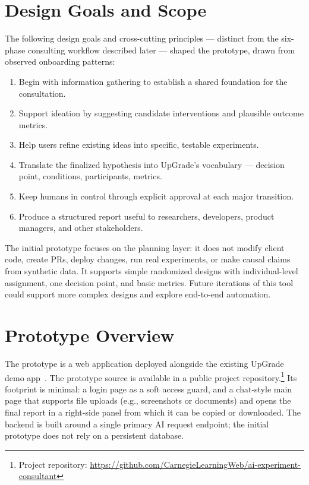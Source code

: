 \documentclass[manuscript,screen]{acmart}
\begin{document}
\section{Design Goals and Scope}

The following design goals and cross-cutting principles --- distinct from the six-phase consulting workflow described later --- shaped the prototype, drawn from observed onboarding patterns:

\begin{enumerate}
  \item Begin with information gathering to establish a shared foundation for the consultation.
  \item Support ideation by suggesting candidate interventions and plausible outcome metrics.
  \item Help users refine existing ideas into specific, testable experiments.
  \item Translate the finalized hypothesis into UpGrade's vocabulary --- decision point, conditions, participants, metrics.
  \item Keep humans in control through explicit approval at each major transition.
  \item Produce a structured report useful to researchers, developers, product managers, and other stakeholders.
\end{enumerate}

The initial prototype focuses on the planning layer: it does not modify client code, create PRs, deploy changes, run real experiments, or make causal claims from synthetic data. It supports simple randomized designs with individual-level assignment, one decision point, and basic metrics. Future iterations of this tool could support more complex designs and explore end-to-end automation. 

\section{Prototype Overview}

The prototype is a web application deployed alongside the existing UpGrade demo app~\cite{upgrade-demo}. The prototype source is available in a public project repository.\footnote{Project repository: \url{https://github.com/CarnegieLearningWeb/ai-experiment-consultant}} Its footprint is minimal: a login page as a soft access guard, and a chat-style main page that supports file uploads (e.g., screenshots or documents) and opens the final report in a right-side panel from which it can be copied or downloaded. The backend is built around a single primary AI request endpoint; the initial prototype does not rely on a persistent database.
\end{document}
